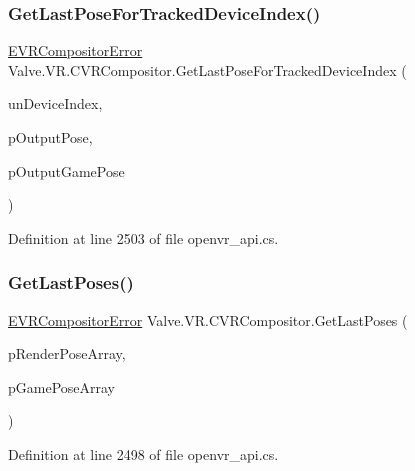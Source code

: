 \subsubsection{\texorpdfstring{GetLastPoseForTrackedDeviceIndex()}{GetLastPoseForTrackedDeviceIndex()}}
{\footnotesize\ttfamily \mbox{\hyperlink{namespace_valve_1_1_v_r_ac34ee1034fda668ccd45f57676ded81b}{E\+V\+R\+Compositor\+Error}} Valve.\+V\+R.\+C\+V\+R\+Compositor.\+Get\+Last\+Pose\+For\+Tracked\+Device\+Index (\begin{DoxyParamCaption}\item[{uint}]{un\+Device\+Index,  }\item[{ref \mbox{\hyperlink{struct_valve_1_1_v_r_1_1_tracked_device_pose__t}{Tracked\+Device\+Pose\+\_\+t}}}]{p\+Output\+Pose,  }\item[{ref \mbox{\hyperlink{struct_valve_1_1_v_r_1_1_tracked_device_pose__t}{Tracked\+Device\+Pose\+\_\+t}}}]{p\+Output\+Game\+Pose }\end{DoxyParamCaption})}



Definition at line 2503 of file openvr\+\_\+api.\+cs.

\mbox{\label{class_valve_1_1_v_r_1_1_c_v_r_compositor_a6d410c16e1f6335e331b5610ded87500}} 
\subsubsection{\texorpdfstring{GetLastPoses()}{GetLastPoses()}}
{\footnotesize\ttfamily \mbox{\hyperlink{namespace_valve_1_1_v_r_ac34ee1034fda668ccd45f57676ded81b}{E\+V\+R\+Compositor\+Error}} Valve.\+V\+R.\+C\+V\+R\+Compositor.\+Get\+Last\+Poses (\begin{DoxyParamCaption}\item[{\mbox{\hyperlink{struct_valve_1_1_v_r_1_1_tracked_device_pose__t}{Tracked\+Device\+Pose\+\_\+t}} \mbox{[}$\,$\mbox{]}}]{p\+Render\+Pose\+Array,  }\item[{\mbox{\hyperlink{struct_valve_1_1_v_r_1_1_tracked_device_pose__t}{Tracked\+Device\+Pose\+\_\+t}} \mbox{[}$\,$\mbox{]}}]{p\+Game\+Pose\+Array }\end{DoxyParamCaption})}



Definition at line 2498 of file openvr\+\_\+api.\+cs.

